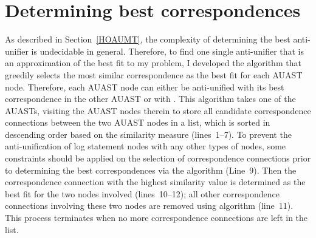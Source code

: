 


\section{Determining best correspondences}  \label{jigsaw-corr}


As described in Section~\ref{HOAUMT}, the complexity of determining the best anti-unifier is undecidable in general. Therefore, to find one single anti-unifier that is an approximation of the best fit to my problem, I developed the  algorithm that greedily selects the most similar correspondence as the best fit for each AUAST node. Therefore, each AUAST node can either be anti-unified with its best correspondence in the other AUAST or with \nothing. This algorithm takes one of the AUASTs, visiting the AUAST nodes therein to store all candidate correspondence connections between the two AUAST nodes in a list, which is sorted in descending order based on the similarity measure (lines~1--7). To prevent the anti-unification of log statement nodes with any other types of nodes, some constraints should be applied on the selection of correspondence connections prior to determining the best correspondences via the  algorithm (Line~9). Then the correspondence connection with the highest similarity value is determined as the best fit for the two nodes involved (lines~10--12); all other correspondence connections involving these two nodes are removed using  algorithm (line~11). This process terminates when no more correspondence connections are left in the list.

